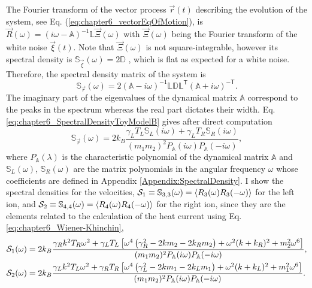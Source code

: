 The Fourier transform of the vector process $\overrightarrow{r}(t)$ describing the evolution of the system, see Eq. (\ref{eq:chapter6_vectorEqOfMotion}),
is $\overrightarrow{R}(\omega) = \left( i \omega - \mathbb{A} \right)^{-1}\mathbb{L}\overrightarrow{\Xi}(\omega)$ with $\overrightarrow{\Xi}(\omega)$ being the Fourier transform of the white noise $\overrightarrow{\xi}(t)$. Note that $\overrightarrow{\Xi}(\omega)$ is not square-integrable, however its spectral density is $\mathbb{S}_{\overrightarrow{\xi}}(\omega) = 2 \mathbb{D}$ \cite{Sarkka2019}, which is flat as expected for a white noise. Therefore, the spectral density matrix of the system is
%
\begin{equation}
  \mathbb{S}_{\overrightarrow{r}} (\omega)= 2 \left(  \mathbb{A} - i\omega\right)^{-1}\mathbb{L}\mathbb{D}\mathbb{L}^\mathsf{T}\left(  \mathbb{A} + i\omega\right)^{-\mathsf{T}}.
  \label{eq:chapter6_SpectralDensityToyModelB}
\end{equation}
%
The imaginary part of the eigenvalues of the dynamical matrix $\mathbb{A}$ correspond to the peaks in the spectrum whereas the real part dictates their width. Eq. \eqref{eq:chapter6_SpectralDensityToyModelB} gives after direct computation
%
\begin{equation}
  \mathbb{S}_{\overrightarrow{r}}(\omega) = 2 k_B \frac{\gamma_L T_L\mathbb{S}_L(i\omega)+\gamma_L T_R\mathbb{S}_R(i\omega)}{(m_1 m_2)^2 P_\mathbb{A}(i\omega)P_\mathbb{A}(-i\omega)},
\end{equation}
%
where $P_\mathbb{A}(\lambda)$ is the characteristic polynomial of the dynamical matrix $\mathbb{A}$ and $\mathbb{S}_L(\omega)$, $\mathbb{S}_R(\omega)$ are the matrix polynomials in the angular frequency $\omega$ whose coefficients are defined in Appendix \ref{Appendix:SpectralDensity}. I show the spectral densities for the velocities, ${\cal{S}}_1\equiv\mathbb{S}_{3,3}(\omega) = \expval{R_3(\omega)R_3(-\omega)}$ for the left ion, and ${\cal S}_2\equiv\mathbb{S}_{4,4}(\omega) = \expval{R_4(\omega)R_4(-\omega)}$ for the right ion, since they are the elements related to the calculation of the heat current using Eq. \eqref{eq:chapter6_Wiener-Khinchin},
%
  \begin{align}
    {\cal S}_1(\omega) &= 2 k_B \frac{\gamma_R k^2 T_R \omega ^2+\gamma_L T_L \left[\omega ^4 \left(\gamma_R^2-2 k m_2-2 k_R m_2\right)+\omega ^2 (k+k_R)^2+m_2^2 \omega ^6\right]}{(m_1 m_2)^2 P_\mathbb{A}(i\omega)P_\mathbb{A}(-i\omega)},\nonumber\\
{\cal S}_2(\omega)
&= 2 k_B \frac{\gamma_L k^2 T_L \omega ^2+\gamma_R T_R \left[\omega ^4 \left(\gamma_L^2-2 k m_1-2 k_L m_1\right)+\omega ^2 (k+k_L)^2+m_1^2 \omega ^6\right]}{(m_1 m_2)^2 P_\mathbb{A}(i\omega)P_\mathbb{A}(-i\omega)}.
    \label{eq:chapter6_SpectralDensitiesVelocities}
  \end{align}

